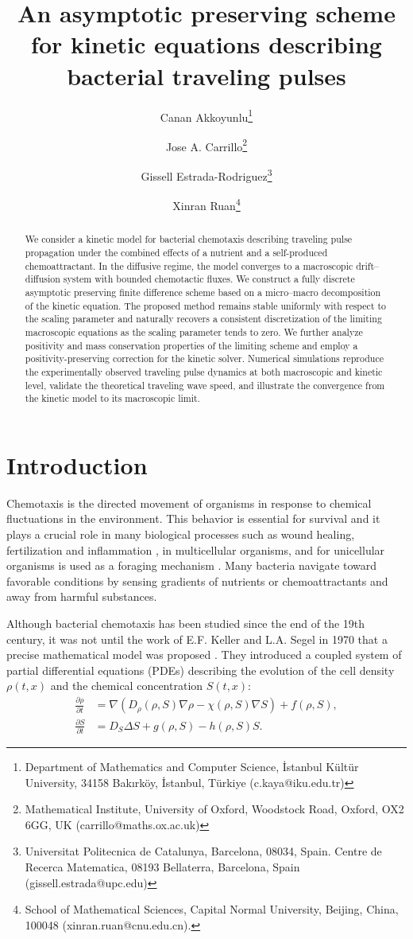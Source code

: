\documentclass[11pt,twoside]{article}
\title{An asymptotic preserving scheme for kinetic equations describing bacterial traveling pulses}
\author{Canan Akkoyunlu\thanks{Department of Mathematics and Computer Science, İstanbul Kültür
University, 34158 Bakırköy, İstanbul, Türkiye (c.kaya@iku.edu.tr)} \and Jose A. Carrillo\thanks{Mathematical Institute, University of Oxford, Woodstock Road, Oxford, OX2 6GG, UK (carrillo@maths.ox.ac.uk)}\and Gissell Estrada-Rodriguez\thanks{Universitat Politecnica de Catalunya, Barcelona, 08034, Spain. Centre de Recerca Matematica, 08193 Bellaterra, Barcelona, Spain (gissell.estrada@upc.edu)} \and  Xinran Ruan\thanks{School of Mathematical Sciences, Capital Normal University, Beijing, China, 100048 (xinran.ruan@cnu.edu.cn). 
} 
}
\date{}
\numberwithin{equation}{section}
\theoremstyle{plain}
\theoremstyle{nonumberplain}
\begin{document}
\maketitle
\begin{abstract}
We consider a kinetic model for bacterial chemotaxis describing traveling pulse propagation under the combined effects of a nutrient and a self-produced chemoattractant. In the diffusive regime, the model converges to a macroscopic drift--diffusion system with bounded chemotactic fluxes. We construct a fully discrete asymptotic preserving finite difference scheme based on a micro--macro decomposition of the kinetic equation. The proposed method remains stable uniformly with respect to the scaling parameter and naturally recovers a consistent discretization of the limiting macroscopic equations as the scaling parameter tends to zero. We further analyze positivity and mass conservation properties of the limiting scheme and employ a positivity-preserving correction for the kinetic solver. Numerical simulations reproduce the experimentally observed traveling pulse dynamics at both macroscopic and kinetic level, validate the theoretical traveling wave speed, and illustrate the convergence from the kinetic model to its macroscopic limit.
\end{abstract}

\section{Introduction}


Chemotaxis is the directed movement of organisms in response to chemical fluctuations in the environment. This behavior is essential for survival \cite{franca2006navigating} and it plays a crucial role in many biological processes such as wound healing, fertilization and inflammation \cite{rickert2000leukocytes}, in multicellular organisms, and for unicellular organisms is used as a foraging mechanism \cite{willard2006signaling,franca2010g}. Many bacteria navigate toward favorable conditions by sensing gradients of nutrients or chemoattractants and away from harmful substances. 

Although bacterial chemotaxis has been studied since the end of the 19th century,  it was not until the work of E.F. Keller and L.A. Segel in 1970 that a precise mathematical model was proposed \cite{keller1971model}. They introduced a coupled system of partial
differential equations (PDEs) describing the evolution of the cell density $\rho(t,x)$ and the
chemical concentration $S(t,x)$:
\begin{subequations}\label{eq:chemicals}
\begin{align}
\frac{\partial \rho}{\partial t} &= \nabla (D_\rho (\rho, S) \nabla \rho - \chi (\rho, S) \nabla S) + f(\rho, S),
  \label{eq: KS1}\\
\frac{\partial S}{\partial t} &= D_S \Delta S + g (\rho, S) - h(\rho, S)S.
  \label{eq: KS2}
\end{align}
\end{subequations}
\end{document}

